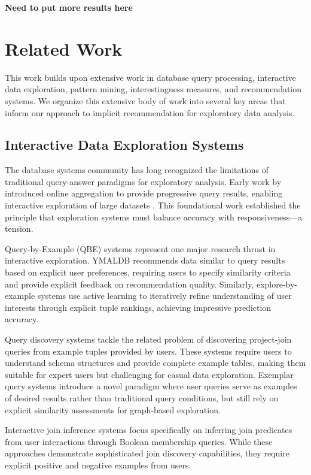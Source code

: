 \documentclass[sigconf, nonacm]{acmart}
\begin{document}
\textbf{Need to put more results here}

\section{Related Work}

This work builds upon extensive work in database query processing, interactive data exploration, pattern mining, interestingness measures, and recommendation systems. We organize this extensive body of work into several key areas that inform our approach to implicit recommendation for exploratory data analysis.

\subsection{Interactive Data Exploration Systems}

The database systems community has long recognized the limitations of traditional query-answer paradigms for exploratory analysis. Early work by introduced online aggregation to provide progressive query results, enabling interactive exploration of large datasets \cite{hellerstein1999online}. This foundational work established the principle that exploration systems must balance accuracy with responsiveness—a tension.

Query-by-Example (QBE) systems represent one major research thrust in interactive exploration. YMALDB \cite{drosouYmaldbExploringRelational2013} recommends data similar to query results based on explicit user preferences, requiring users to specify similarity criteria and provide explicit feedback on recommendation quality. Similarly, explore-by-example systems \cite{dimitriadouAIDEActiveLearningBased2016} use active learning to iteratively refine understanding of user interests through explicit tuple rankings, achieving impressive prediction accuracy. 

Query discovery systems \cite{shen2014discovering} tackle the related problem of discovering project-join queries from example tuples provided by users. These systems require users to understand schema structures and provide complete example tables, making them suitable for expert users but challenging for casual data exploration. Exemplar query systems \cite{mottin2014exemplar} introduce a novel paradigm where user queries serve as examples of desired results rather than traditional query conditions, but still rely on explicit similarity assessments for graph-based exploration.

Interactive join inference systems \cite{bonifati2014interactive} focus specifically on inferring join predicates from user interactions through Boolean membership queries. While these approaches demonstrate sophisticated join discovery capabilities, they require explicit positive and negative examples from users.
\end{document}
